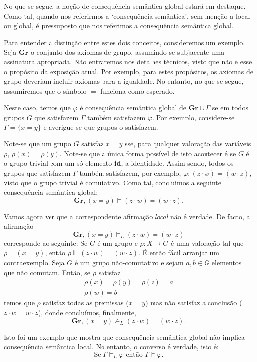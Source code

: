\documentclass{report}
\theoremstyle{definition}
\theoremstyle{remark}
\begin{document}
	No que se segue, a noção de consequência semântica global estará em destaque. Como tal, quando nos referirmos a `consequência semântica', sem menção a local ou global, é pressuposto que nos referimos a consequência semântica global.
	
	Para entender a distinção entre estes dois conceitos, consideremos um exemplo. Seja $\mathbf{Gr}$ o conjunto dos axiomas de grupo, assumindo-se subjacente uma assinatura apropriada. Não entraremos nos detalhes técnicos, visto que não é esse o propósito da exposição atual. Por exemplo, para estes propósitos, os axiomas de grupo deveriam incluir axiomas para a igualdade. No entanto, no que se segue, assumiremos que o símbolo $=$ funciona como esperado.
	
	Neste caso, temos que $\varphi$ é consequência semântica global de $\mathbf{Gr} \cup \Gamma$ se em todos grupos $G$ que satisfazem $\Gamma$ também satisfazem $\varphi$. Por exemplo, considere-se $\Gamma = \{x = y\}$ e averigue-se que grupos o satisfazem.
	
	Note-se que um grupo $G$ satisfaz $x = y$ sse, para qualquer valoração das variáveis $\rho$, $\rho(x) = \rho(y)$. Note-se que a única forma possível de isto acontecer é se $G$ é o grupo trivial com um só elemento \textbf{id}, a identidade. Assim sendo, todos os grupos que satisfazem $\Gamma$ também satisfazem, por exemplo, $\varphi : (z \cdot w) = (w \cdot z)$, visto que o grupo trivial é comutativo. Como tal, concluímos a seguinte consequência semântica global:
	\[\mathbf{Gr}, (x = y) \vDash (z \cdot w) = (w \cdot z).\]
	
	Vamos agora ver que a correspondente afirmação \emph{local} não é verdade. De facto, a afirmação
	\[\mathbf{Gr}, (x = y) \vDash_L (z \cdot w) = (w \cdot z)\]
	corresponde ao seguinte: Se $G$ é um grupo e $\rho : X \to G$ é uma valoração tal que $\rho \Vdash (x = y)$, então $\rho \Vdash (z \cdot w) = (w \cdot z)$. É então fácil arranjar um contraexemplo. Seja $G$ é um grupo não-comutativo e sejam $a, b \in G$ elementos que não comutam. Então, se $\rho$ satisfaz
	\begin{gather*}
	\rho(x) = \rho(y) = \rho(z) = a\\
	\rho(w) = b
	\end{gather*}
	temos que $\rho$ satisfaz todas as premissas ($x = y$) mas não satisfaz a conclusão ($z\cdot w = w\cdot z$), donde concluímos, finalmente,
	\[\mathbf{Gr}, (x = y) \nvDash_L (z \cdot w) = (w \cdot z).\]
	
	Isto foi um exemplo que mostra que consequência semântica global não implica consequência semântica local. No entanto, o converso é verdade, isto é:
	\[\text{Se } \Gamma \vDash_L \varphi \text{ então } \Gamma \vDash \varphi.\]
	
\end{document}
